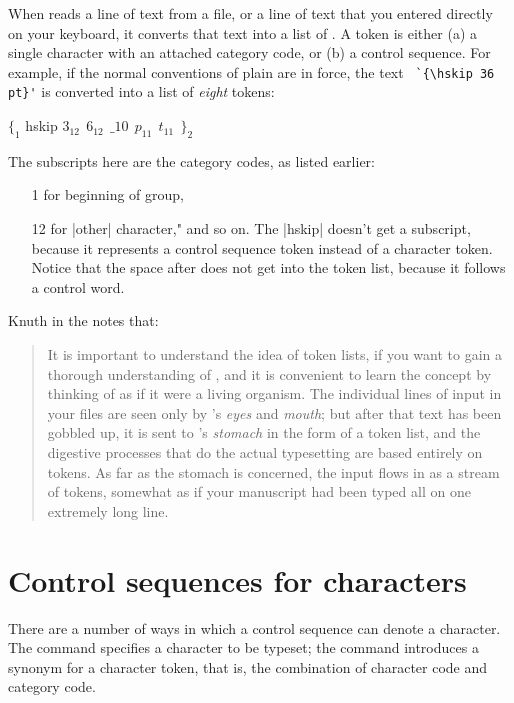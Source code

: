 When \tex reads a line of text from a file, or a line of text that you entered
directly on your keyboard, it converts that text into a list of \cmd{\tokens}. A
token is either (a) a single character with an attached category code, or (b) a control
sequence. For example, if the normal conventions of plain \tex  are in force, the text
\verb*+ `{\hskip 36 pt}'+  is converted into a list of \textit{eight} tokens:
\medskip

$ \{_{1}$ hskip $3_{12}~~6_{12}~~\_{10}~~p_{11}~~t_{11}~~\}_2 $

\medskip
The subscripts here are the category codes, as listed earlier:
\begin{itemize}
\item[1] for beginning of group,
\item[12] for |other| character," and so on. The |hskip| doesn't get a subscript, because it
represents a control sequence token instead of a character token. Notice that the space
after  does not get into the token list, because it follows a control word.
\end{itemize}

Knuth in the \texbook notes that:

\begin{quotation}

It is important to understand the idea of token lists, if you want to gain a
thorough understanding of \tex, and it is convenient to learn the concept by
thinking of \tex as if it were a living organism. The individual lines of input in your
files are seen only by \tex's \textit{eyes} and \textit{mouth}; but after that text has been gobbled
up, it is sent to \tex's \textit{stomach} in the form of a token list, and the digestive processes
that do the actual typesetting are based entirely on tokens. As far as the stomach is
concerned, the input 
flows in as a stream of tokens, somewhat as if your \tex manuscript
had been typed all on one extremely long line.
\end{quotation}

\section{Control sequences for characters}

\DescribeMacro{\char}
There are a number of ways in which a control sequence can denote a character. The \cmd{\char} command
specifies a character to be typeset; the \cmd{\let} command introduces a synonym for a character
token, that is, the combination of character code and category code.

